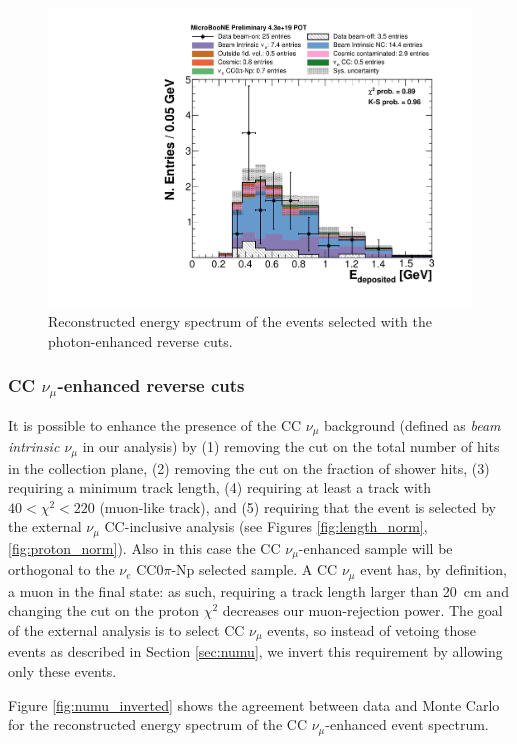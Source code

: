 \begin{figure}[htbp]
\centering
  \includegraphics[width=0.7\linewidth]{figures/nc_reco.pdf}
  \caption{Reconstructed energy spectrum of the events selected with the photon-enhanced reverse cuts.}\label{fig:photon}
\end{figure}

\subsubsection{CC \texorpdfstring{$\nu_{\mu}$}{numu}-enhanced reverse cuts}
It is possible to enhance the presence of the CC $\nu_{\mu}$ background (defined as \emph{beam intrinsic $\nu_{\mu}$} in our analysis) by (1) removing the cut on the total number of hits in the collection plane, (2) removing the cut on the fraction of shower hits, (3) requiring a minimum track length, (4) requiring at least a track with $40 < \chi^{2} < 220$ (muon-like track), and (5) requiring that the event is selected by the external $\nu_{\mu}$ CC-inclusive analysis \cite{ubxsec} (see Figures \ref{fig:length_norm}, \ref{fig:proton_norm}). Also in this case the CC $\nu_{\mu}$-enhanced sample will be orthogonal to the $\nu_{e}$ CC0$\pi$-Np selected sample.
A CC $\nu_{\mu}$ event has, by definition, a muon in the final state: as such, requiring a track length larger than 20~cm and changing the cut on the proton $\chi^2$ decreases our muon-rejection power. The goal of the external analysis is to select CC $\nu_{\mu}$ events, so instead of vetoing those events as described in Section \ref{sec:numu}, we invert this requirement by allowing only these events.

Figure \ref{fig:numu_inverted} shows the agreement between data and Monte Carlo for the reconstructed energy spectrum of the CC $\nu_{\mu}$-enhanced event spectrum.

